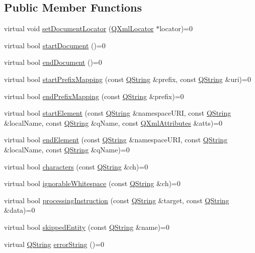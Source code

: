 \subsection*{Public Member Functions}
\begin{DoxyCompactItemize}
\item 
virtual void \mbox{\hyperlink{class_q_xml_content_handler_a89863bd9a6372d3d73086aa99107bca7}{set\+Document\+Locator}} (\mbox{\hyperlink{class_q_xml_locator}{Q\+Xml\+Locator}} $\ast$locator)=0
\item 
virtual bool \mbox{\hyperlink{class_q_xml_content_handler_aaca36268e66c9a56257e38bce18ae4d2}{start\+Document}} ()=0
\item 
virtual bool \mbox{\hyperlink{class_q_xml_content_handler_a534bd1e4627e65340eb17d90d1ab1c12}{end\+Document}} ()=0
\item 
virtual bool \mbox{\hyperlink{class_q_xml_content_handler_acdf18588f1980d19d12efd025a5f5cc9}{start\+Prefix\+Mapping}} (const \mbox{\hyperlink{class_q_string}{Q\+String}} \&prefix, const \mbox{\hyperlink{class_q_string}{Q\+String}} \&uri)=0
\item 
virtual bool \mbox{\hyperlink{class_q_xml_content_handler_a1c7f3e794c2e763e043eef3229ccf034}{end\+Prefix\+Mapping}} (const \mbox{\hyperlink{class_q_string}{Q\+String}} \&prefix)=0
\item 
virtual bool \mbox{\hyperlink{class_q_xml_content_handler_af6d4e631fad2b9b75622c95003b1da55}{start\+Element}} (const \mbox{\hyperlink{class_q_string}{Q\+String}} \&namespace\+U\+RI, const \mbox{\hyperlink{class_q_string}{Q\+String}} \&local\+Name, const \mbox{\hyperlink{class_q_string}{Q\+String}} \&q\+Name, const \mbox{\hyperlink{class_q_xml_attributes}{Q\+Xml\+Attributes}} \&atts)=0
\item 
virtual bool \mbox{\hyperlink{class_q_xml_content_handler_af0abc06326798a6e522f91e6174b7b9e}{end\+Element}} (const \mbox{\hyperlink{class_q_string}{Q\+String}} \&namespace\+U\+RI, const \mbox{\hyperlink{class_q_string}{Q\+String}} \&local\+Name, const \mbox{\hyperlink{class_q_string}{Q\+String}} \&q\+Name)=0
\item 
virtual bool \mbox{\hyperlink{class_q_xml_content_handler_a3be0d440b48836560c8805e15d596eb1}{characters}} (const \mbox{\hyperlink{class_q_string}{Q\+String}} \&ch)=0
\item 
virtual bool \mbox{\hyperlink{class_q_xml_content_handler_a58470bd94366833c79a3c60fb350d157}{ignorable\+Whitespace}} (const \mbox{\hyperlink{class_q_string}{Q\+String}} \&ch)=0
\item 
virtual bool \mbox{\hyperlink{class_q_xml_content_handler_a520c875b64f2f06ec35001a5e50887c3}{processing\+Instruction}} (const \mbox{\hyperlink{class_q_string}{Q\+String}} \&target, const \mbox{\hyperlink{class_q_string}{Q\+String}} \&data)=0
\item 
virtual bool \mbox{\hyperlink{class_q_xml_content_handler_ac3b27d569634c5d7a7fac001a6cc4845}{skipped\+Entity}} (const \mbox{\hyperlink{class_q_string}{Q\+String}} \&name)=0
\item 
virtual \mbox{\hyperlink{class_q_string}{Q\+String}} \mbox{\hyperlink{class_q_xml_content_handler_adba96547bad1cf1b009dbfb7b7c571be}{error\+String}} ()=0
\end{DoxyCompactItemize}


